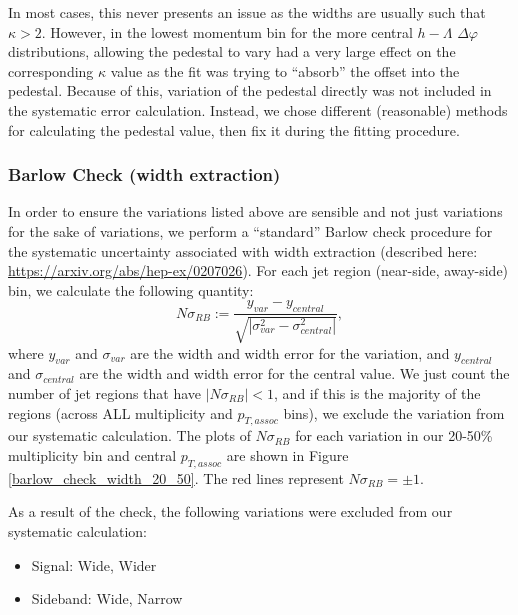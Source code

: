 \documentclass[ALICE,manyauthors]{ALICE_analysis_notes}
\begin{document}
In most cases, this never presents an issue as the widths are usually such that $\kappa > 2$. However, in the lowest momentum bin for the more central $h-\Lambda$ $\Delta\varphi$ distributions, allowing the pedestal to vary had a very large effect on the corresponding $\kappa$ value as the fit was trying to ``absorb'' the offset into the pedestal. Because of this, variation of the pedestal directly was not included in the systematic error calculation. Instead, we chose different (reasonable) methods for calculating the pedestal value, then fix it during the fitting procedure.

\subsubsection{Barlow Check (width extraction)}
\label{barlow_check_width}

In order to ensure the variations listed above are sensible and not just variations for the sake of variations, we perform a ``standard'' Barlow check procedure for the systematic uncertainty associated with width extraction (described here: \url{https://arxiv.org/abs/hep-ex/0207026}). For each jet region (near-side, away-side) bin, we calculate the following quantity:
\begin{equation}
	N\sigma_{RB} := \frac{y_{var} - y_{central}}{\sqrt{|\sigma_{var}^2 - \sigma_{central}^2|}},
\end{equation}
where $y_{var}$ and $\sigma_{var}$ are the width and width error for the variation, and $y_{central}$ and $\sigma_{central}$ are the width and width error for the central value. We just count the number of jet regions that have $|N\sigma_{RB}| < 1$, and if this is the majority of the regions (across ALL multiplicity and $p_{T, assoc}$ bins), we exclude the variation from our systematic calculation. The plots of $N\sigma_{RB}$ for each variation in our 20-50\% multiplicity bin and central $p_{T, assoc}$ are shown in Figure \ref{barlow_check_width_20_50}. The red lines represent $N\sigma_{RB} = \pm 1$.

As a result of the check, the following variations were excluded from our systematic calculation:
\begin{itemize}
\item Signal: Wide, Wider
\item Sideband: Wide, Narrow
\end{itemize}
\end{document}
